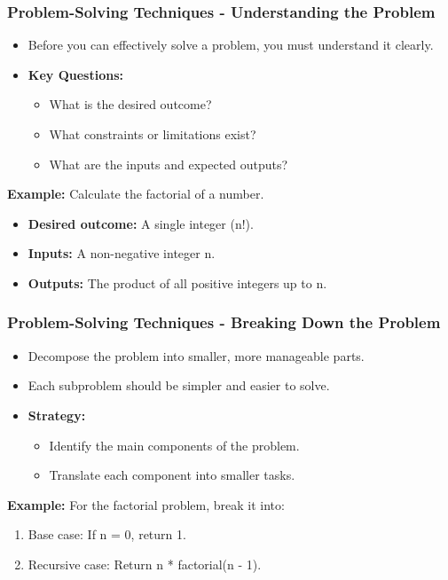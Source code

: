 \documentclass{beamer}
\begin{document}
\begin{frame}
    \frametitle{Problem-Solving Techniques - Understanding the Problem}
    \begin{itemize}
        \item Before you can effectively solve a problem, you must understand it clearly.
        \item \textbf{Key Questions:}
        \begin{itemize}
            \item What is the desired outcome?
            \item What constraints or limitations exist?
            \item What are the inputs and expected outputs?
        \end{itemize}
    \end{itemize}
    
    \textbf{Example:} Calculate the factorial of a number.
    \begin{itemize}
        \item \textbf{Desired outcome:} A single integer (n!).
        \item \textbf{Inputs:} A non-negative integer n.
        \item \textbf{Outputs:} The product of all positive integers up to n.
    \end{itemize}
\end{frame}

\begin{frame}
    \frametitle{Problem-Solving Techniques - Breaking Down the Problem}
    \begin{itemize}
        \item Decompose the problem into smaller, more manageable parts.
        \item Each subproblem should be simpler and easier to solve.
        \item \textbf{Strategy:}
        \begin{itemize}
            \item Identify the main components of the problem.
            \item Translate each component into smaller tasks.
        \end{itemize}
    \end{itemize}
    
    \textbf{Example:} For the factorial problem, break it into:
    \begin{enumerate}
        \item Base case: If n = 0, return 1.
        \item Recursive case: Return n * factorial(n - 1).
    \end{enumerate}
\end{frame}
\end{document}
